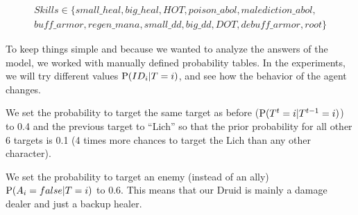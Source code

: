 \begin{eqnarray*}
Skills \in \{ small\_heal, big\_heal, HOT, poison\_abol, malediction\_abol,\\
            buff\_armor, regen\_mana, small\_dd, big\_dd, DOT, debuff\_armor, root \}
\end{eqnarray*}

To keep things simple and because we wanted to analyze the answers of the model, we worked with manually defined probability tables.%
In the experiments, we will try different values %
$\mathrm{P}(ID_i | T=i)$, and see how the behavior of the agent changes. 

We set the probability to target the same target as before ($\mathrm{P}(T^t=i|T^{t-1}=i)$) to 0.4 and the previous target to ``Lich'' so that the prior probability for all other 6 targets is 0.1 (4 times more chances to target the Lich than any other character). 

We set the probability to target an enemy (instead of an ally) $\mathrm{P}(A_i=false|T=i)$ to 0.6. This means that our Druid is mainly a damage dealer and just a backup healer. 

